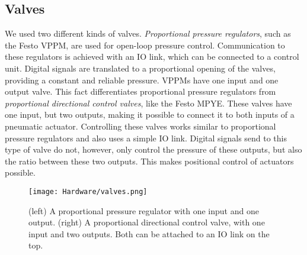 \subsection{Valves}
We used two different kinds of valves. \textit{Proportional pressure regulators}, such as the Festo VPPM, are used for open-loop pressure control. Communication to these regulators is achieved with an IO link, which can be connected to a control unit. Digital signals are translated to a proportional opening of the valves, providing a constant and reliable pressure. VPPMs have one input and one output valve. This fact differentiates proportional pressure regulators from \textit{proportional directional control valves}, like the Festo MPYE. These valves have one input, but two outputs, making it possible to connect it to both inputs of a pneumatic actuator. Controlling these valves works similar to proportional pressure regulators and also uses a simple IO link. Digital signals send to this type of valve do not, however, only control the pressure of these outputs, but also the ratio between these two outputs. This makes positional control of actuators possible.

\begin{figure}[ht!]
    \texttt{[image: Hardware/valves.png]}
    \centering
    \caption{(left) A proportional pressure regulator with one input and one output. (right) A proportional directional control valve, with one input and two outputs. Both can be attached to an IO link on the top.}
    \label{fig:valves}
\end{figure}

